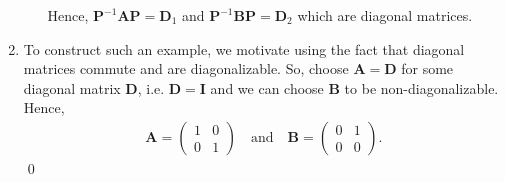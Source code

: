 \documentclass[12pt]{article}
\begin{document}
\begin{enumerate}[label=\textbf{(\alph*)}]
\begin{enumerate}[label=\textbf{(\roman*)}]
        Hence, $\mathbf{P}^{-1}\mathbf{AP}=\mathbf{D}_1$ and $\mathbf{P}^{-1}\mathbf{BP}=\mathbf{D}_2$ which are diagonal matrices.
    \end{enumerate}
    \item To construct such an example, we motivate using the fact that diagonal matrices commute and are diagonalizable. So, choose $\mathbf{A}=\mathbf{D}$ for some diagonal matrix $\mathbf{D}$, i.e. $\mathbf{D}=\mathbf{I}$ and we can choose $\mathbf{B}$ to be non-diagonalizable. Hence, \begin{align*}
        \mathbf{A}=\begin{pmatrix}
            1&0\\0&1
        \end{pmatrix}\quad\text{and}\quad \mathbf{B}=\begin{pmatrix}
            0&1\\0&0
        \end{pmatrix}.
    \end{align*} \qed 
\end{enumerate}
\end{document}
